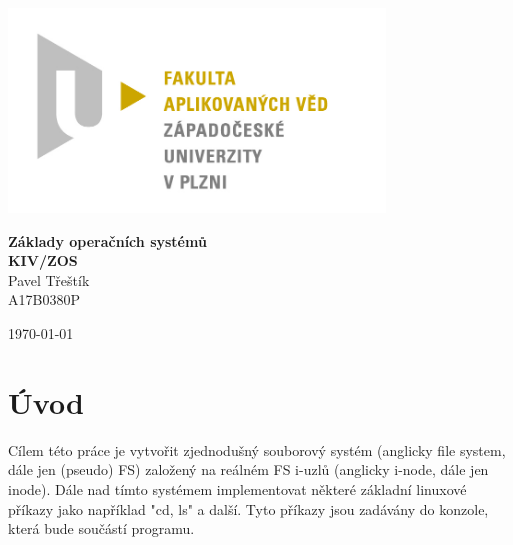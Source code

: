\documentclass[12pt]{report}
\begin{document}
%

\begin{titlepage}
\centerline{\includegraphics[width=10cm]{img/logo.jpg}}
\begin{center}
\vspace{30px}
{\huge
\textbf{Základy operačních systémů}\\
\vspace{1cm}
}
{\large
\textbf{KIV/ZOS}\\
\vspace{1cm}
}
\vspace{1cm}
{\large
Pavel Třeštík\\
}
{\normalsize
A17B0380P
}
\end{center}
\vspace{\fill}
\hfill
\begin{minipage}[t]{7cm}
\flushright
\today
\end{minipage}
\end{titlepage}


\tableofcontents



\chapter{Úvod}
Cílem této práce je vytvořit zjednodušný souborový systém (anglicky file system, dále jen (pseudo) FS) založený
na reálném FS i-uzlů (anglicky i-node, dále jen inode). Dále nad tímto systémem implementovat některé
základní linuxové příkazy jako například "cd, ls" a další. Tyto příkazy jsou zadávány do konzole, která 
bude součástí programu.
\end{document}
